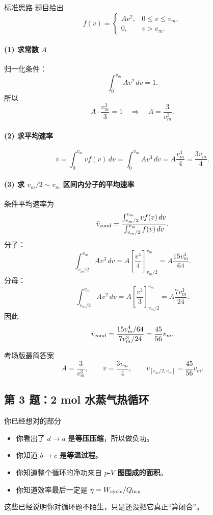 \documentclass[11pt,a4paper]{ctexart}
\newcommand{\key}[1]{\textcolor{theme}{\textbf{#1}}}
\begin{document}
\begin{stepbox}{标准思路}
题目给出
\[
f(v)=
\begin{cases}
Av^2, & 0\le v\le v_m,\\
0, & v>v_m.
\end{cases}
\]

\paragraph{(1) 求常数 \(A\)}
归一化条件：
\[
\int_0^{v_m} Av^2\,dv=1.
\]
所以
\[
A\cdot \frac{v_m^3}{3}=1
\quad\Rightarrow\quad
A=\frac{3}{v_m^3}.
\]

\paragraph{(2) 求平均速率}
\[
\bar v=\int_0^{v_m} v f(v)\,dv
  =\int_0^{v_m} Av^3\,dv
  =A\frac{v_m^4}{4}
  =\frac{3v_m}{4}.
\]

\paragraph{(3) 求 \(v_m/2\sim v_m\) 区间内分子的平均速率}
条件平均速率为
\[
\bar v_{\rm cond}
=\frac{\int_{v_m/2}^{v_m} v f(v)\,dv}
       {\int_{v_m/2}^{v_m} f(v)\,dv}.
\]
分子：
\[
\int_{v_m/2}^{v_m} Av^3\,dv
=A\left[\frac{v^4}{4}\right]_{v_m/2}^{v_m}
=A\frac{15v_m^4}{64}.
\]
分母：
\[
\int_{v_m/2}^{v_m} Av^2\,dv
=A\left[\frac{v^3}{3}\right]_{v_m/2}^{v_m}
=A\frac{7v_m^3}{24}.
\]
因此
\[
\bar v_{\rm cond}
=\frac{15v_m^4/64}{7v_m^3/24}
=\frac{45}{56}v_m.
\]
\end{stepbox}

\begin{summarybox}{考场版最简答案}
\[
A=\frac{3}{v_m^3},\qquad
\bar v=\frac{3v_m}{4},\qquad
\bar v_{[v_m/2,v_m]}=\frac{45}{56}v_m.
\]
\end{summarybox}

\subsection*{第 3 题：2 mol 水蒸气热循环}

\begin{goodbox}{你已经想对的部分}
\begin{itemize}
  \item 你看出了 \(d\to a\) 是\key{等压压缩}，所以做负功。
  \item 你知道 \(b\to c\) 是\key{等温过程}。
  \item 你知道整个循环的净功来自 \key{$p$-$V$ 图围成的面积}。
  \item 你知道效率最后一定是 \(\eta=W_{\rm cycle}/Q_{\rm in}\)。
\end{itemize}
这些已经说明你对循环题不陌生，只是还没把它真正“算闭合”。
\end{goodbox}
\end{document}
